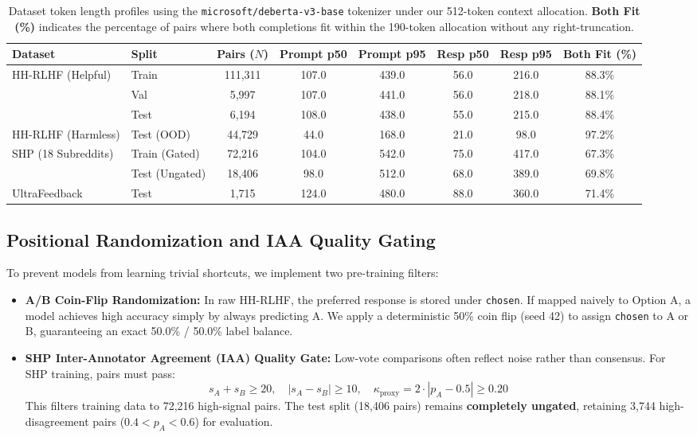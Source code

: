 \documentclass[12pt,a4paper]{article}
\begin{document}
\begin{table}[H]
\centering
\small
\renewcommand{\arraystretch}{1.2}
\begin{tabular}{llcccccc}
\toprule
\textbf{Dataset} & \textbf{Split} & \textbf{Pairs ($N$)} & \textbf{Prompt p50} & \textbf{Prompt p95} & \textbf{Resp p50} & \textbf{Resp p95} & \textbf{Both Fit (\%)} \\
\midrule
\multirow{3}{*}{HH-RLHF (Helpful)} & Train & 111,311 & 107.0 & 439.0 & 56.0 & 216.0 & 88.3\% \\
& Val & 5,997 & 107.0 & 441.0 & 56.0 & 218.0 & 88.1\% \\
& Test & 6,194 & 108.0 & 438.0 & 55.0 & 215.0 & 88.4\% \\
\midrule
HH-RLHF (Harmless) & Test (OOD) & 44,729 & 44.0 & 168.0 & 21.0 & 98.0 & 97.2\% \\
\midrule
\multirow{2}{*}{SHP (18 Subreddits)} & Train (Gated) & 72,216 & 104.0 & 542.0 & 75.0 & 417.0 & 67.3\% \\
& Test (Ungated) & 18,406 & 98.0 & 512.0 & 68.0 & 389.0 & 69.8\% \\
\midrule
UltraFeedback & Test & 1,715 & 124.0 & 480.0 & 88.0 & 360.0 & 71.4\% \\
\bottomrule
\end{tabular}
\caption{Dataset token length profiles using the \texttt{microsoft/deberta-v3-base} tokenizer under our 512-token context allocation. \textbf{Both Fit (\%)} indicates the percentage of pairs where both completions fit within the 190-token allocation without any right-truncation.}
\label{tab:data_stats}
\end{table}

\subsection{Positional Randomization and IAA Quality Gating}
To prevent models from learning trivial shortcuts, we implement two pre-training filters:
\begin{itemize}
    \item \textbf{A/B Coin-Flip Randomization:} In raw HH-RLHF, the preferred response is stored under \texttt{chosen}. If mapped naively to Option A, a model achieves high accuracy simply by always predicting A. We apply a deterministic 50\% coin flip (seed 42) to assign \texttt{chosen} to A or B, guaranteeing an exact 50.0\% / 50.0\% label balance.
    \item \textbf{SHP Inter-Annotator Agreement (IAA) Quality Gate:} Low-vote comparisons often reflect noise rather than consensus. For SHP training, pairs must pass:
    \begin{equation}
        s_A + s_B \ge 20, \quad |s_A - s_B| \ge 10, \quad \kappa_{\text{proxy}} = 2 \cdot |p_A - 0.5| \ge 0.20
    \end{equation}
    This filters training data to 72,216 high-signal pairs. The test split (18,406 pairs) remains \textbf{completely ungated}, retaining 3,744 high-disagreement pairs ($0.4 < p_A < 0.6$) for evaluation.
\end{itemize}
\end{document}
